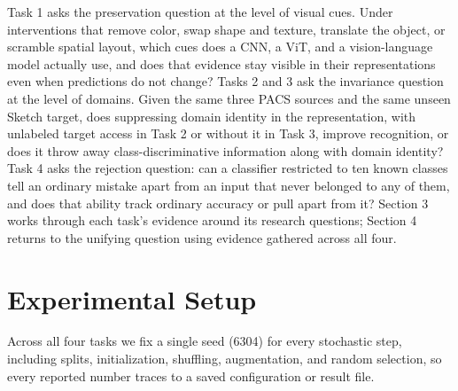 \documentclass{article}
\begin{document}
Task 1 asks the preservation question at the level of visual cues. Under interventions that remove
color, swap shape and texture, translate the object, or scramble spatial layout, which cues does a
CNN, a ViT, and a vision-language model actually use, and does that evidence stay visible in their
representations even when predictions do not change? Tasks 2 and 3 ask the invariance question at
the level of domains. Given the same three PACS sources and the same unseen Sketch target, does
suppressing domain identity in the representation, with unlabeled target access in Task 2 or
without it in Task 3, improve recognition, or does it throw away class-discriminative information
along with domain identity? Task 4 asks the rejection question: can a classifier restricted to ten
known classes tell an ordinary mistake apart from an input that never belonged to any of them, and
does that ability track ordinary accuracy or pull apart from it? Section 3 works through each
task's evidence around its research questions; Section 4 returns to the unifying question using
evidence gathered across all four.

\section{Experimental Setup}

Across all four tasks we fix a single seed (6304) for every stochastic step, including splits,
initialization, shuffling, augmentation, and random selection, so every reported number traces to
a saved configuration or result file.
\end{document}
